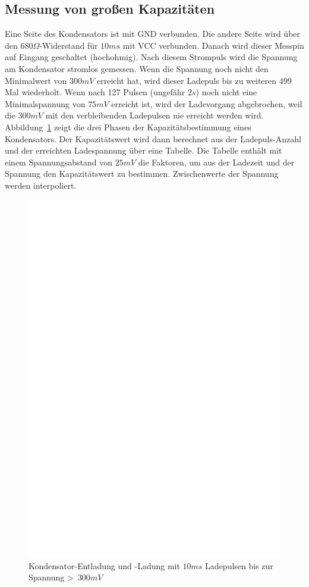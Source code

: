 \subsection{Messung von großen Kapazitäten}
\label{sec:bigcap}
Eine Seite des Kondensators ist mit GND verbunden. Die andere Seite wird über den \(680\Omega\)-Widerstand für \(10ms\) mit VCC verbunden.
Danach wird dieser Messpin auf Eingang geschaltet (hochohmig).
Nach diesem Strompuls wird die Spannung am Kondensator stromlos gemessen.
Wenn die Spannung noch nicht den Minimalwert von \(300mV\) erreicht hat, wird dieser Ladepuls bis zu weiteren 499 Mal wiederholt.
Wenn nach 127 Pulsen (ungefähr \(2s\)) noch nicht eine Minimalspannung von \(75mV\) erreicht ist, wird der Ladevorgang abgebrochen,
 weil die \(300mV\) mit den verbleibenden Ladepulsen nie erreicht werden wird.
Abbildung~\ref{fig:bigcap1} zeigt die drei Phasen der Kapazitätsbestimmung eines Kondensators.
Der Kapazitätswert wird dann berechnet aus der Ladepuls-Anzahl und der erreichten Ladespannung über eine Tabelle.
Die Tabelle enthält mit einem Spannungsabstand von \(25mV\) die Faktoren, um aus der Ladezeit und der Spannung 
den Kapazitätswert zu bestimmen. 
Zwischenwerte der Spannung werden interpoliert.

\begin{figure}[H]
\centering
\includegraphics[]{../FIG/Bigcap.eps}
\caption{Kondensator-Entladung und -Ladung mit \(10ms\) Ladepulsen bis zur Spannung \textgreater~\(300mV\)}
\label{fig:bigcap1}
\end{figure}

